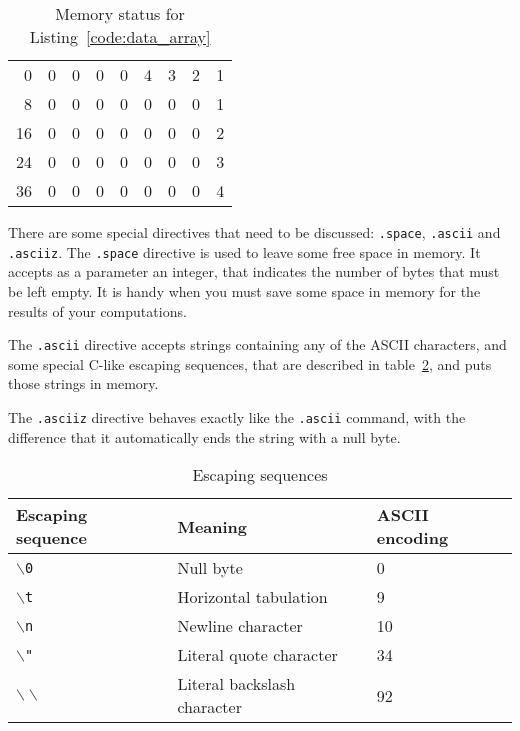 \documentclass[12pt]{report}
\begin{document}
\begin{table}[htb]
	\begin{centering}
		\begin{tabular}{r|c|c|c|c|c|c|c|c|}
			\cline{2-9}
			0 & 0 & 0 & 0 & 0 &4 & 3 &2 &1 \\
			\cline{2-9}
			8 & 0 & 0 & 0 & 0 &0 & 0 &0 &1 \\
			\cline{2-9}
			16 & 0 & 0 & 0 & 0 &0 & 0 &0 &2 \\
			\cline{2-9}
			24 & 0 & 0 & 0 & 0 &0 & 0 &0 &3 \\
			\cline{2-9}
			36 & 0 & 0 & 0 & 0 &0 & 0 &0 &4\\ 
			\cline{2-9}
		\end{tabular}
		\caption{Memory status for Listing~\ref{code:data_array}}
		\label{table:effect}
	\end{centering}
\end{table}
There are some special directives that need to be discussed: \texttt{.space}, 
\texttt{.ascii} and \texttt{.asciiz}.
The \texttt{.space} directive is used to leave some free space in memory. It
accepts as a parameter an integer, that indicates the number of bytes that must
be left empty. It is handy when you must save some space in memory for the
results of your computations.

The \texttt{.ascii} directive accepts strings containing any of the ASCII
characters, and some special C-like escaping sequences, that are described in
table~\ref{table:escaping}, and puts those strings in memory.

The \texttt{.asciiz} directive behaves exactly like the \texttt{.ascii} command,
with the difference that it automatically ends the string with a null byte.

\begin{table}[!htb]
	\begin{tabular}{lll}
		\hline
		\hline
		Escaping sequence & Meaning & ASCII encoding\\
		\hline
		\texttt{$\backslash$0} & Null byte & 0\\
		\texttt{$\backslash$t} & Horizontal tabulation & 9\\
		\texttt{$\backslash$n} & Newline character & 10\\
		\texttt{$\backslash$"} & Literal quote character & 34\\
		\texttt{$\backslash\backslash$} & Literal backslash character & 92
	\end{tabular}
	\caption{Escaping sequences}
	\label{table:escaping}
\end{table}
\end{document}
